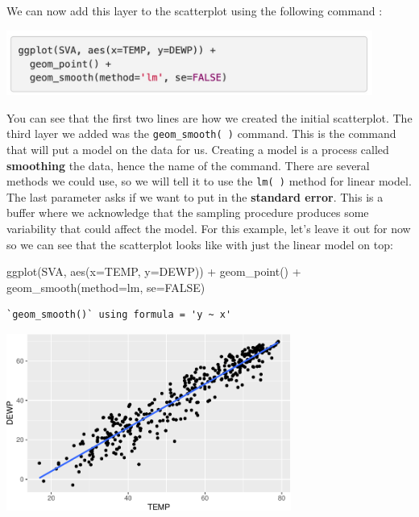 \documentclass[
  letterpaper,
  DIV=11,
  numbers=noendperiod]{scrreprt}
\newenvironment{Shaded}{\begin{snugshade}}{\end{snugshade}}
\newcommand{\AttributeTok}[1]{\textcolor[rgb]{0.40,0.45,0.13}{#1}}
\newcommand{\ConstantTok}[1]{\textcolor[rgb]{0.56,0.35,0.01}{#1}}
\newcommand{\FunctionTok}[1]{\textcolor[rgb]{0.28,0.35,0.67}{#1}}
\newcommand{\NormalTok}[1]{\textcolor[rgb]{0.00,0.23,0.31}{#1}}
\newcommand{\SpecialCharTok}[1]{\textcolor[rgb]{0.37,0.37,0.37}{#1}}
\newcommand{\StringTok}[1]{\textcolor[rgb]{0.13,0.47,0.30}{#1}}
\begin{document}
We can now add this layer to the scatterplot using the following command
:

\includegraphics[width=0.9\textwidth,height=\textheight]{./images/LMR_11.jpg}

You can see that the first two lines are how we created the initial
scatterplot. The third layer we added was the \texttt{geom\_smooth(\ )}
command. This is the command that will put a model on the data for us.
Creating a model is a process called \textbf{smoothing} the data, hence
the name of the command. There are several methods we could use, so we
will tell it to use the \texttt{lm(\ )} method for linear model. The
last parameter asks if we want to put in the \textbf{standard error}.
This is a buffer where we acknowledge that the sampling procedure
produces some variability that could affect the model. For this example,
let's leave it out for now so we can see that the scatterplot looks like
with just the linear model on top:

\begin{Shaded}
\begin{Highlighting}[]
\FunctionTok{ggplot}\NormalTok{(SVA, }\FunctionTok{aes}\NormalTok{(}\AttributeTok{x=}\NormalTok{TEMP, }\AttributeTok{y=}\NormalTok{DEWP)) }\SpecialCharTok{+}
  \FunctionTok{geom\_point}\NormalTok{() }\SpecialCharTok{+}
  \FunctionTok{geom\_smooth}\NormalTok{(}\AttributeTok{method=}\StringTok{\textquotesingle{}lm\textquotesingle{}}\NormalTok{, }\AttributeTok{se=}\ConstantTok{FALSE}\NormalTok{)}
\end{Highlighting}
\end{Shaded}

\begin{verbatim}
`geom_smooth()` using formula = 'y ~ x'
\end{verbatim}

\begin{center}
\includegraphics[width=0.7\textwidth,height=\textheight]{Linear_Modeling_and_Regression_files/figure-pdf/unnamed-chunk-12-1.pdf}
\end{center}
\end{document}
